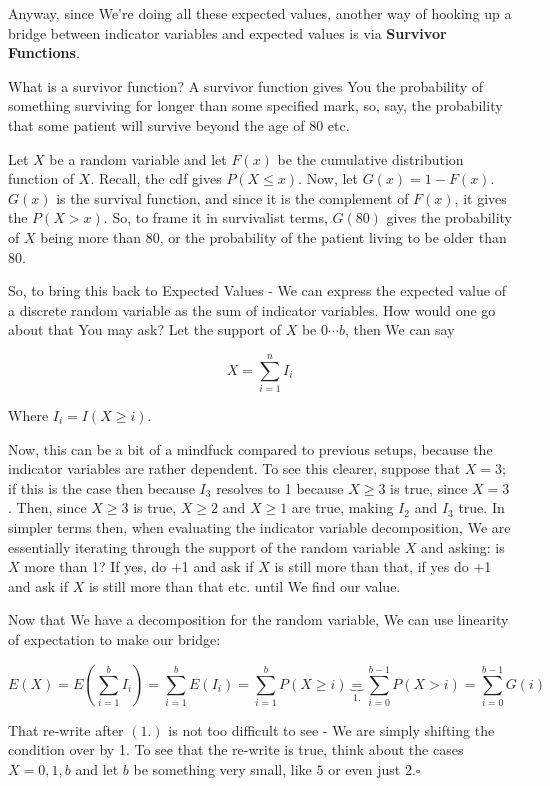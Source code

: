 \documentclass{article}
\newcommand{\qed}{\hfill$\square$}
\begin{document}
		Anyway, since We're doing all these expected values, another way of hooking up a bridge between indicator variables and expected values is via \textbf{Survivor Functions}.

		What is a survivor function? A survivor function gives You the probability of something surviving for longer than some specified mark, so, say, the probability that some patient will survive beyond the age of 80 etc.
		
		Let $X$ be a random variable and let $F(x)$ be the cumulative distribution function of $X$. Recall, the cdf gives $P(X \le x)$. Now, let $G(x) = 1 - F(x)$. $G(x)$ is the survival function, and since it is the complement of $F(x)$, it gives the $P(X > x)$. So, to frame it in survivalist terms, $G(80)$ gives the probability of $X$ being more than 80, or the probability of the patient living to be older than 80. 
		
		So, to bring this back to Expected Values - We can express the expected value of a discrete random variable as the sum of indicator variables. How would one go about that You may ask? Let the support of $X$ be $0\cdots b$, then We can say 
		
		$$X = \sum^n_{i=1} I_i$$
		
		Where $I_i = I(X \ge i)$.
		
		Now, this can be a bit of a mindfuck compared to previous setups, because the indicator variables are rather dependent. To see this clearer, suppose that $X = 3$; if this is the case then because $I_3$ resolves to 1 because $X \ge 3$ is true, since $X = 3$. Then, since $X \ge 3$ is true, $X \ge 2$ and $X \ge 1$ are true, making $I_2$ and $I_3$ true. In simpler terms then, when evaluating the indicator variable decomposition, We are essentially iterating through the support of the random variable $X$ and asking: is $X$ more than 1? If yes, do +1 and ask if $X$ is still more than that, if yes do +1 and ask if $X$ is still more than that etc. until We find our value.
		
		Now that We have a decomposition for the random variable, We can use linearity of expectation to make our bridge:
		
		$$E(X) = E\left(\sum^b_{i=1} I_i\right) = \sum^b_{i=1} E(I_i) = \sum^b_{i=1} P(X \ge i) \underbrace{=}_{1.} \sum^{b-1}_{i=0} P(X > i) = \sum^{b-1}_{i=0} G(i)$$
		
		That re-write after $(1.)$ is not too difficult to see - We are simply shifting the condition over by 1. To see that the re-write is true, think about the cases $X = 0, 1, b$ and let $b$ be something very small, like $5$ or even just $2$.\qed
		
\end{document}
